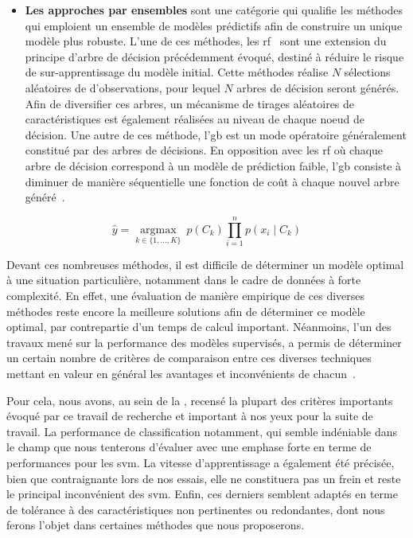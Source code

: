\begin{itemize}
    \item \textbf{Les approches par ensembles} sont une catégorie qui qualifie les méthodes qui emploient un ensemble de modèles prédictifs afin de construire un unique modèle plus robuste. L'une de ces méthodes, les \gls{rf}~\cite{Breiman2001} sont une extension du principe d'arbre de décision précédemment évoqué, destiné à réduire le risque de sur-apprentissage du modèle initial. Cette méthodes réalise $N$ sélections aléatoires de d'observations, pour lequel $N$ arbres de décision seront générés. Afin de diversifier ces arbres, un mécanisme de tirages aléatoires de caractéristiques est également réalisées au niveau de chaque noeud de décision. Une autre de ces méthode, l'\gls{gb} est un mode opératoire généralement constitué par des arbres de décisions. En opposition avec les \gls{rf} où chaque arbre de décision correspond à un modèle de prédiction faible, l'\gls{gb} consiste à diminuer de manière séquentielle une fonction de coût à chaque nouvel arbre généré~\cite{Friedman2001}.
\end{itemize}\par

\begin{equation} 
    \label{eq:bayesian}
    \hat{y} = \underset{k \in \{1, \ldots, K\}}{\operatorname{argmax}} \ p(C_k) \displaystyle\prod_{i=1}^n p(x_i \mid C_k)
\end{equation}

Devant ces nombreuses méthodes, il est difficile de déterminer un modèle optimal à une situation particulière, notamment dans le cadre de données à forte complexité. En effet, une évaluation de manière empirique de ces diverses méthodes reste encore la meilleure solutions afin de déterminer ce modèle optimal, par contrepartie d'un temps de calcul important. Néanmoins, l'un des travaux mené sur la performance des modèles supervisés, a permis de déterminer un certain nombre de critères de comparaison entre ces diverses techniques mettant en valeur en général les avantages et inconvénients de chacun~\cite{Kotsiantis2007}.\par

Pour cela, nous avons, au sein de la , recensé la plupart des critères importants évoqué par ce travail de recherche et important à nos yeux pour la suite de travail. La performance de classification notamment, qui semble indéniable dans le champ que nous tenterons d'évaluer avec une emphase forte en terme de performances pour les \gls{svm}. La vitesse d'apprentissage a également été précisée, bien que contraignante lors de nos essais, elle ne constituera pas un frein et reste le principal inconvénient des \gls{svm}. Enfin, ces derniers semblent adaptés en terme de tolérance à des caractéristiques non pertinentes ou redondantes, dont nous ferons l'objet dans certaines méthodes que nous proposerons.\par

